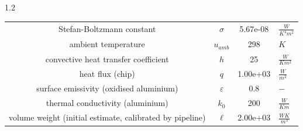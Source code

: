 \documentclass[preview]{standalone}
\begin{document}
\begin{spacing}{1.2}
\begin{tabular}{cccl}
\toprule
Stefan-Boltzmann constant & $\sigma$ & 5.67e-08 & $\frac{W}{K^4 m^2}$ \\ 
ambient temperature & $u_{amb}$ & 298 & $K$ \\ 
convective heat transfer coefficient & $h$ & 25 & $\frac{W}{K m^2}$ \\ 
heat flux (chip) & $q$ & 1.00e+03 & $\frac{W}{m^2}$ \\ 
surface emissivity (oxidised aluminium) & $\varepsilon$ & 0.8 & $-$ \\ 
thermal conductivity (aluminium) & $k_{0}$ & 200 & $\frac{W}{K m}$ \\ 
volume weight (initial estimate, calibrated by pipeline) & $\ell$ & 2.00e+03 & $\frac{W K}{m^3}$ \\ 
\bottomrule
\end{tabular}
\end{spacing}
\end{document}
